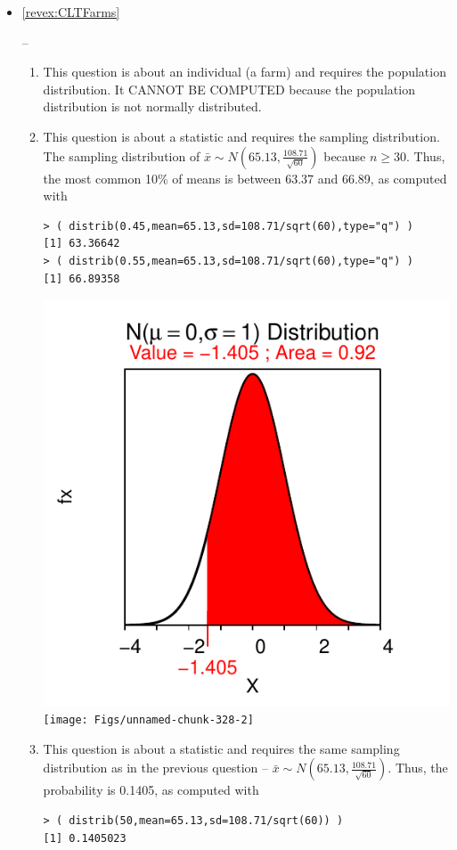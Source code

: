 \documentclass[10pt,openany]{book}\usepackage[]{graphicx}\usepackage[]{color}
\makeatletter
\newenvironment{kframe}{%
 \def\at@end@of@kframe{}%
 \ifinner\ifhmode%
  \def\at@end@of@kframe{\end{minipage}}%
  \begin{minipage}{\columnwidth}%
 \fi\fi%
 \def\FrameCommand##1{\hskip\@totalleftmargin \hskip-\fboxsep
 \colorbox{shadecolor}{##1}\hskip-\fboxsep
     \hskip-\linewidth \hskip-\@totalleftmargin \hskip\columnwidth}%
 \MakeFramed {\advance\hsize-\width
   \@totalleftmargin\z@ \linewidth\hsize
   \@setminipage}}%
 {\par\unskip\endMakeFramed%
 \at@end@of@kframe}
\newenvironment{knitrout}{}{} %
\makeatother
\begin{document}
\begin{itemize}
\begin{enumerate}
\begin{knitrout}
\end{knitrout}
    \end{enumerate}
  \item \hypertarget{ans:CLTFarms}{\ref{revex:CLTFarms}} --
    \begin{enumerate}
       \item This question is about an individual (a farm) and requires the population distribution. It CANNOT BE COMPUTED because the population distribution is not normally distributed.
       \item This question is about a statistic and requires the sampling distribution.  The sampling distribution of $\bar{x}\sim N(65.13,\frac{108.71}{\sqrt{60}})$ because $n \geq 30$.  Thus, the most common 10\% of means is between 63.37 and 66.89, as computed with
\begin{knitrout}
\color{fgcolor}\begin{kframe}
\begin{verbatim}
> ( distrib(0.45,mean=65.13,sd=108.71/sqrt(60),type="q") )
[1] 63.36642
> ( distrib(0.55,mean=65.13,sd=108.71/sqrt(60),type="q") )
[1] 66.89358
\end{verbatim}
\end{kframe}

{\centering \includegraphics[width=.4\linewidth]{Figs/unnamed-chunk-328-1} 
\texttt{[image: Figs/unnamed-chunk-328-2]} 

}



\end{knitrout}
       \item This question is about a statistic and requires the same sampling distribution as in the previous question -- $\bar{x}\sim N(65.13,\frac{108.71}{\sqrt{60}})$.  Thus, the probability is 0.1405, as computed with
\begin{knitrout}
\color{fgcolor}\begin{kframe}
\begin{verbatim}
> ( distrib(50,mean=65.13,sd=108.71/sqrt(60)) )
[1] 0.1405023
\end{verbatim}
\end{kframe}


\end{knitrout}
\end{enumerate}
\end{itemize}
\end{document}
